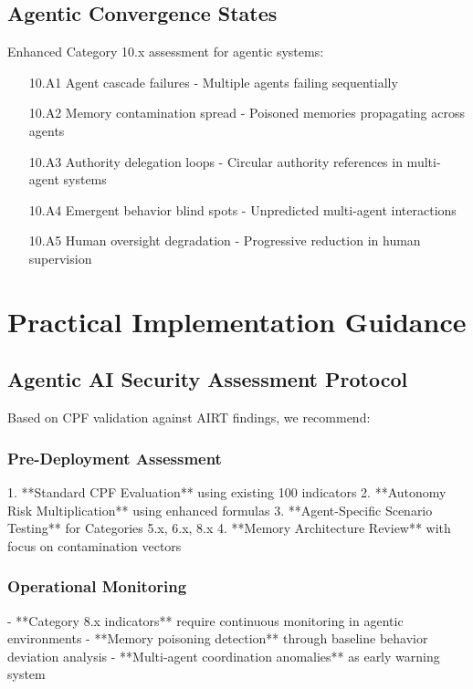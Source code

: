 \documentclass[11pt,a4paper]{article}
\begin{document}
\subsection{Agentic Convergence States}

Enhanced Category 10.x assessment for agentic systems:

\begin{enumerate}
\item[10.A1] Agent cascade failures - Multiple agents failing sequentially
\item[10.A2] Memory contamination spread - Poisoned memories propagating across agents
\item[10.A3] Authority delegation loops - Circular authority references in multi-agent systems
\item[10.A4] Emergent behavior blind spots - Unpredicted multi-agent interactions
\item[10.A5] Human oversight degradation - Progressive reduction in human supervision
\end{enumerate}

\section{Practical Implementation Guidance}

\subsection{Agentic AI Security Assessment Protocol}

Based on CPF validation against AIRT findings, we recommend:

\subsubsection{Pre-Deployment Assessment}
1. **Standard CPF Evaluation** using existing 100 indicators
2. **Autonomy Risk Multiplication** using enhanced formulas
3. **Agent-Specific Scenario Testing** for Categories 5.x, 6.x, 8.x
4. **Memory Architecture Review** with focus on contamination vectors

\subsubsection{Operational Monitoring}
- **Category 8.x indicators** require continuous monitoring in agentic environments
- **Memory poisoning detection** through baseline behavior deviation analysis
- **Multi-agent coordination anomalies** as early warning system
\end{document}
